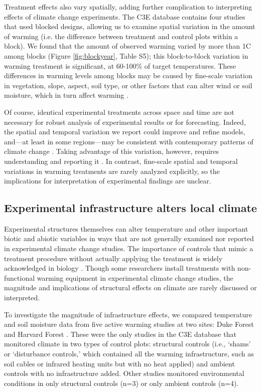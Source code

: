 \documentclass{article}
\begin{document}
\par Treatment effects also vary spatially, adding further complication to interpreting effects of climate change experiments. The C3E database contains four studies that used blocked designs, allowing us to examine spatial variation in the amount of warming (i.e. the difference between treatment and control plots within a block). We found that the amount of observed warming varied by more than 1\degree C among blocks (Figure \ref{fig:blockyear}, Table S5); this block-to-block variation in warming treatment is significant, at 60-100\% of target temperatures. These differences in warming levels among blocks may be caused by fine-scale variation in vegetation, slope, aspect, soil type, or other factors that can alter wind or soil moisture, which in turn affect warming \citep{peterjohn1993,kimball2005,kimball2008,hoeppner2012,rollinson2015}. 

\par Of course, identical experimental treatments across space and time are not necessary for robust analysis of experimental results or for forecasting. Indeed, the spatial and temporal variation we report could improve and refine models, and---at least in some regions---may be consistent with contemporary patterns of climate change \citep{ipcc2013}. Taking advantage of this variation, however, requires understanding and reporting it \citep[e.g.,][]{milcu2016}. In contrast, fine-scale spatial and temporal variations in warming treatments are rarely analyzed explicitly, so the implications for interpretation of experimental findings are unclear.

\subsection* {Experimental infrastructure alters local climate}
Experimental structures themselves can alter temperature and other important biotic and abiotic variables in ways that are not generally examined nor reported in experimental climate change studies. The importance of controls that mimic a treatment procedure without actually applying the treatment is widely acknowledged in biology \citep[e.g.,][]{spector2001,johnson2002,quinn2002}. Though some researchers install treatments with non-functional warming equipment in experimental climate change studies, the magnitude and implications of structural effects on climate are rarely discussed or interpreted.
\par To investigate the magnitude of infrastructure effects, we compared temperature and soil moisture data from five active warming studies at two sites: Duke Forest and Harvard Forest \citep{farnsworth1995,clark2014b, marchin2015, pelini2011}. These were the only studies in the C3E database that monitored climate in two types of control plots: structural controls (i.e., `shams' or `disturbance controls,' which contained all the warming infrastructure, such as soil cables or infrared heating units but with no heat applied) and ambient controls with no infrastructure added. Other studies monitored environmental conditions in only structural controls (n=3) or only ambient controls (n=4).
\end{document}
